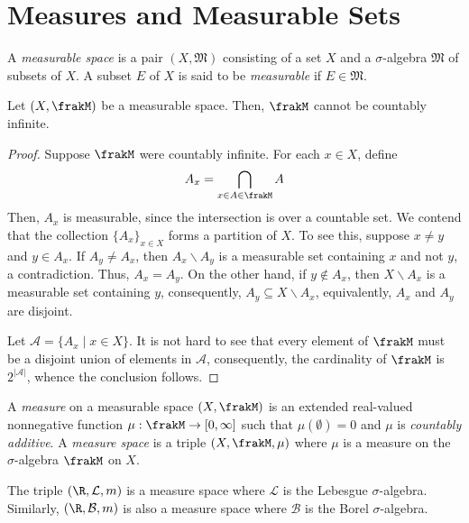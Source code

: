 \section{Measures and Measurable Sets}

\begin{definition}
    A \textit{measurable space} is a pair $(X,\mathfrak M)$ consisting of a set $X$ and a $\sigma$-algebra $\mathfrak M$ of subsets of $X$. A subset $E$ of $X$ is said to be \textit{measurable} if $E\in\mathfrak M$.
\end{definition}

\begin{proposition}
    Let $(X,\frakM)$ be a measurable space. Then, $\frakM$ cannot be countably infinite.
\end{proposition}
\begin{proof}
    Suppose $\frakM$ were countably infinite. For each $x\in X$, define 
    \begin{equation*}
        A_x = \bigcap_{x\in A\in\frakM} A
    \end{equation*}
    Then, $A_x$ is measurable, since the intersection is over a countable set. We contend that the collection $\{A_x\}_{x\in X}$ forms a partition of $X$. To see this, suppose $x\ne y$ and $y\in A_x$. If $A_y\ne A_x$, then $A_x\backslash A_y$ is a measurable set containing $x$ and not $y$, a contradiction. Thus, $A_x = A_y$. On the other hand, if $y\notin A_x$, then $X\backslash A_x$ is a measurable set containing $y$, consequently, $A_y\subseteq X\backslash A_x$, equivalently, $A_x$ and $A_y$ are disjoint.

    Let $\mathscr A = \{A_x\mid x\in X\}$. It is not hard to see that every element of $\frakM$ must be a disjoint union of elements in $\mathscr A$, consequently, the cardinality of $\frakM$ is $2^{|\mathscr A|}$, whence the conclusion follows.
\end{proof}

\begin{definition}[Measure]
    A \textit{measure} on a measurable space $(X,\frakM)$ is an extended real-valued nonnegative function $\mu:\frakM\to[0,\infty]$ such that $\mu(\emptyset) = 0$ and $\mu$ is \textit{countably additive}. A \textit{measure space} is a triple $(X,\frakM,\mu)$ where $\mu$ is a measure on the $\sigma$-algebra $\frakM$ on $X$.
\end{definition}

The triple $(\R,\mathcal L, m)$ is a measure space where $\mathcal L$ is the Lebesgue $\sigma$-algebra. Similarly, $(\R,\mathcal B, m)$ is also a measure space where $\mathcal B$ is the Borel $\sigma$-algebra.

